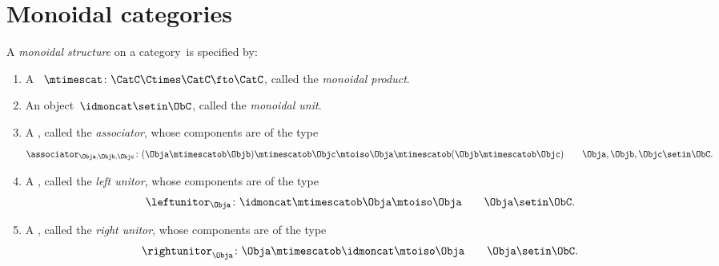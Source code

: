 
\section{Monoidal categories}
\label{sec:parallelism-mon-cat}

%

\begin{ctdefinition}
    \label{def:monoidal-cat}
    A \emph{monoidal structure} on a category~\CatC is specified by:

    \constit
    \begin{enumerate}
        \item A ~$\mtimescat \colon \CatC \Ctimes \CatC\fto \CatC$, called the \emph{monoidal product}.
        \item An object~$\idmoncat \setin \ObC$, called the \emph{monoidal unit}.
        \item A , called the \emph{associator}, whose components are of the type
              \begin{equation}
                  \associator_{\Obja,\Objb,\Objc}\colon (\Obja \mtimescatob \Objb )\mtimescatob \Objc \mtoiso \Obja\mtimescatob (\Objb \mtimescatob \Objc) \quad \quad \Obja,\Objb,\Objc\setin \ObC.
              \end{equation}
        \item A , called the \emph{left unitor}, whose components are of the type
              \begin{equation}
                  \leftunitor_\Obja \colon \idmoncat\mtimescatob \Obja \mtoiso \Obja \quad \quad \Obja\setin \ObC.
              \end{equation}
        \item A , called the \emph{right unitor}, whose components are of the type
              \begin{equation}
                  \rightunitor_\Obja \colon \Obja \mtimescatob \idmoncat \mtoiso \Obja \quad \quad \Obja\setin \ObC.
              \end{equation}
    \end{enumerate}


\end{ctdefinition}
